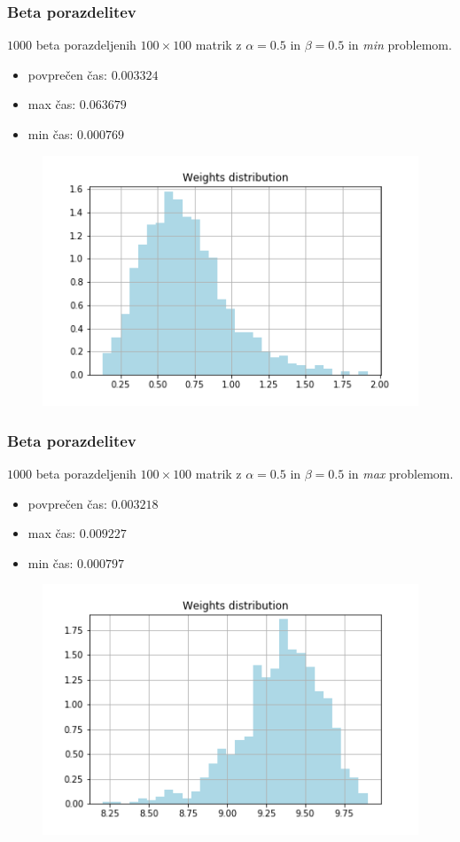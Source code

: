 \documentclass{beamer}
\begin{document}
\begin{frame}
    \frametitle{Beta porazdelitev}
    \begin{block}{}
        $1000$ beta porazdeljenih $100 \times 100$ matrik z $\alpha = 0.5$ in
        $\beta = 0.5$ in \textit{min} problemom.
        \begin{itemize}
            \item povprečen čas: $0.003324$
            \item max čas: $0.063679$
            \item min čas: $0.000769$
        \end{itemize}
    \end{block}
    \begin{figure}[htbp]
        \centerline{\includegraphics[scale=0.40]{picture1004minbeta.png}}
    \end{figure}
\end{frame}

\begin{frame}
    \frametitle{Beta porazdelitev}
    \begin{block}{}
        $1000$ beta porazdeljenih $100 \times 100$ matrik z $\alpha = 0.5$ in
        $\beta = 0.5$ in \textit{max} problemom.
        \begin{itemize}
            \item povprečen čas: $0.003218$
            \item max čas: $0.009227$
            \item min čas: $0.000797$
        \end{itemize}
    \end{block}
    \begin{figure}[htbp]
        \centerline{\includegraphics[scale=0.40]{picture1004maxbeta.png}}
    \end{figure}
\end{frame}
\end{document}
